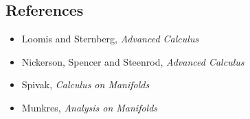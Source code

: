 \subsection*{References}
\begin{itemize}
  \item Loomis and Sternberg, \emph{Advanced Calculus}
  \item Nickerson, Spencer and Steenrod, \emph{Advanced Calculus}
  \item Spivak, \emph{Calculus on Manifolds}
  \item Munkres, \emph{Analysis on Manifolds}
\end{itemize}
